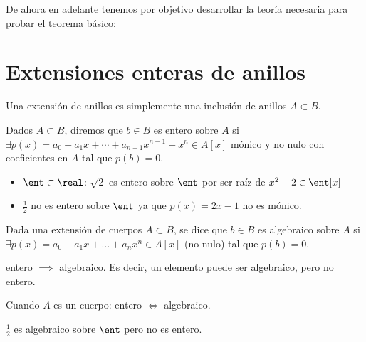 De ahora en adelante tenemos por objetivo desarrollar la teoría necesaria para probar el teorema básico:

\section{Extensiones enteras de anillos}

Una extensión de anillos es simplemente una inclusión de anillos $A\subset B$.

\begin{defn} \label{def:ElementoEntero}
	Dados $A \subset B$, diremos que $b \in B$ es entero sobre $A$ si $\exists p(x)=a_0+a_1x+ \dotsb +a_{n-1}x^{n-1}+x^n \in A[x]$ mónico y no nulo con coeficientes en $A$ tal que $p(b)=0$.
\end{defn}

\begin{example}
	\begin{itemize}
	\item $\ent \subset \real$: $\sqrt{2}$ es entero sobre $\ent$ por ser raíz de $x^2-2 \in \ent[x]$
	\item $\frac{1}{2}$ no es entero sobre $\ent$ ya que $p(x)=2x-1$ no es mónico.
	\end{itemize}
\end{example}


\begin{defn} 
	Dada una extensión de cuerpos $A \subset B$, se dice que $b \in B$ es algebraico sobre $A$ si $\exists p(x)=a_0+a_1x+...+a_nx^n \in A[x]$ (no nulo) tal que $p(b)=0$.
\end{defn}

\obs entero $\implies$ algebraico. Es decir, un elemento puede ser algebraico, pero no entero.

\obs Cuando $A$ es un cuerpo: entero $\Leftrightarrow$ algebraico.


\begin{example}
	$\frac{1}{2}$ es algebraico sobre $\ent$ pero no es entero.
\end{example}

